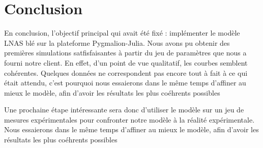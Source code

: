 \section*{Conclusion}

En conclusion, l'objectif principal qui avait été fixé : implémenter le modèle LNAS blé sur la plateforme Pygmalion-Julia. Nous avons pu obtenir des premières simulations satfisfaisantes à partir du jeu de paramètres que nous a fourni notre client. En effet, d'un point de vue qualitatif, les courbes semblent cohérentes. Quelques données ne correspondent pas encore tout à fait à ce qui était attendu, c'est pourquoi nous essaierons dans le même temps d'affiner au mieux le modèle, afin d'avoir les résultats les plus coéhrents possibles

Une prochaine étape intéressante sera donc d'utiliser le modèle sur un jeu de mesures expérimentales pour confronter notre modèle à la réalité expérimentale.
Nous essaierons dans le même temps d'affiner au mieux le modèle, afin d'avoir les résultats les plus coéhrents possibles


